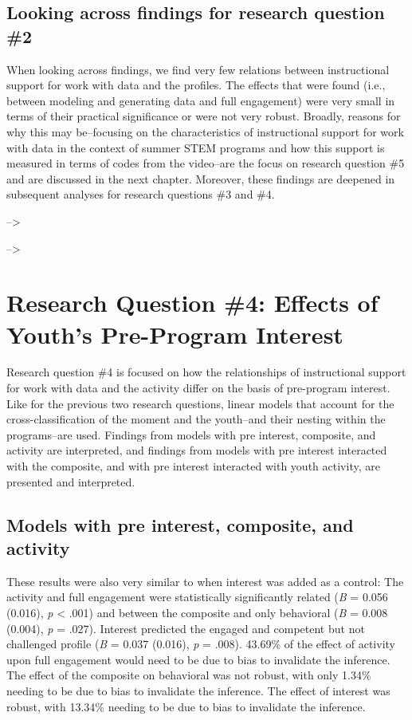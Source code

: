 \documentclass[]{msu-thesis}
\theoremstyle{definition}
\theoremstyle{definition}
\theoremstyle{definition}
\theoremstyle{remark}
\begin{document}
\subsection{Looking across findings for research question
\#2}\label{looking-across-findings-for-research-question-2}

When looking across findings, we find very few relations between
instructional support for work with data and the profiles. The effects
that were found (i.e., between modeling and generating data and full
engagement) were very small in terms of their practical significance or
were not very robust. Broadly, reasons for why this may be--focusing on
the characteristics of instructional support for work with data in the
context of summer STEM programs and how this support is measured in
terms of codes from the video--are the focus on research question \#5
and are discussed in the next chapter. Moreover, these findings are
deepened in subsequent analyses for research questions \#3 and \#4.

--\textgreater{}

--\textgreater{}

\section{Research Question \#4: Effects of Youth's Pre-Program
Interest}\label{research-question-4-effects-of-youths-pre-program-interest}

Research question \#4 is focused on how the relationships of
instructional support for work with data and the activity differ on the
basis of pre-program interest. Like for the previous two research
questions, linear models that account for the cross-classification of
the moment and the youth--and their nesting within the programs--are
used. Findings from models with pre interest, composite, and activity
are interpreted, and findings from models with pre interest interacted
with the composite, and with pre interest interacted with youth
activity, are presented and interpreted.

\subsection{Models with pre interest, composite, and
activity}\label{models-with-pre-interest-composite-and-activity}

These results were also very similar to when interest was added as a
control: The activity and full engagement were statistically
significantly related (\emph{B} = 0.056 (0.016), \emph{p} \textless{}
.001) and between the composite and only behavioral (\emph{B} = 0.008
(0.004), \emph{p} = .027). Interest predicted the engaged and competent
but not challenged profile (\emph{B} = 0.037 (0.016), \emph{p} = .008).
43.69\% of the effect of activity upon full engagement would need to be
due to bias to invalidate the inference. The effect of the composite on
behavioral was not robust, with only 1.34\% needing to be due to bias to
invalidate the inference. The effect of interest was robust, with
13.34\% needing to be due to bias to invalidate the inference.
\end{document}
